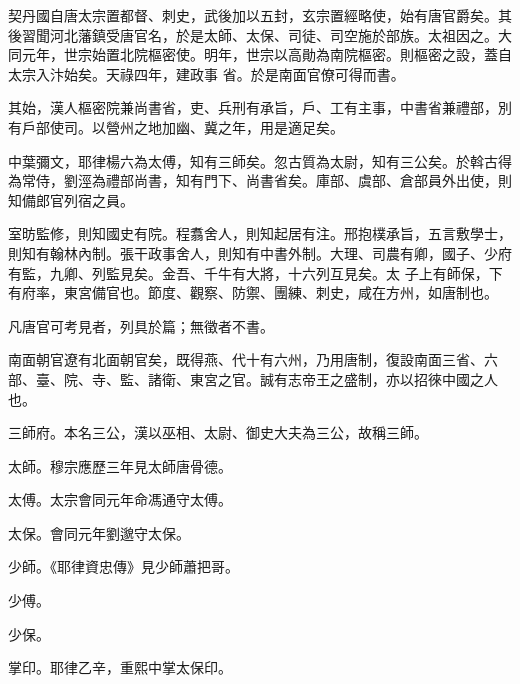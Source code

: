 
\begin{pinyinscope}

 契丹國自唐太宗置都督、刺史，武後加以五封，玄宗置經略使，始有唐官爵矣。其後習聞河北藩鎮受唐官名，於是太師、太保、司徒、司空施於部族。太祖因之。大同元年，世宗始置北院樞密使。明年，世宗以高勛為南院樞密。則樞密之設，蓋自太宗入汴始矣。天祿四年，建政事
 省。於是南面官僚可得而書。



 其始，漢人樞密院兼尚書省，吏、兵刑有承旨，戶、工有主事，中書省兼禮部，別有戶部使司。以營州之地加幽、冀之年，用是適足矣。



 中葉彌文，耶律楊六為太傅，知有三師矣。忽古質為太尉，知有三公矣。於斡古得為常侍，劉涇為禮部尚書，知有門下、尚書省矣。庫部、虞部、倉部員外出使，則知備郎官列宿之員。



 室昉監修，則知國史有院。程翥舍人，則知起居有注。邢抱樸承旨，五言敷學士，則知有翰林內制。張干政事舍人，則知有中書外制。大理、司農有卿，國子、少府有監，九卿、列監見矣。金吾、千牛有大將，十六列互見矣。太
 子上有師保，下有府率，東宮備官也。節度、觀察、防禦、團練、刺史，咸在方州，如唐制也。



 凡唐官可考見者，列具於篇；無徵者不書。



 南面朝官遼有北面朝官矣，既得燕、代十有六州，乃用唐制，復設南面三省、六部、臺、院、寺、監、諸衛、東宮之官。誠有志帝王之盛制，亦以招徠中國之人也。



 三師府。本名三公，漢以巫相、太尉、御史大夫為三公，故稱三師。



 太師。穆宗應歷三年見太師唐骨德。



 太傅。太宗會同元年命馮通守太傅。



 太保。會同元年劉邈守太保。



 少師。《耶律資忠傳》見少師蕭把哥。



 少傅。



 少保。



 掌印。耶律乙辛，重熙中掌太保印。




\end{pinyinscope}
